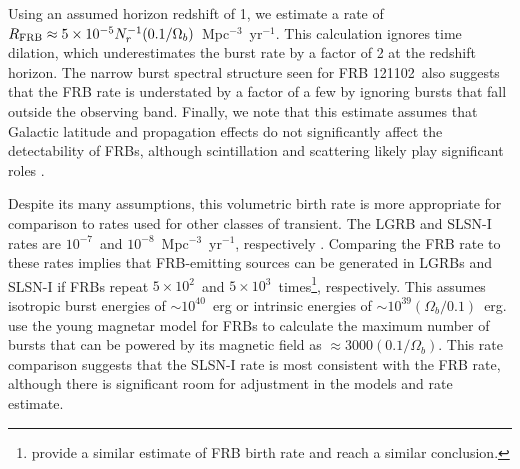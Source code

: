 \documentclass[twocolumn]{aastex61}
\newcommand{\frb}{FRB 121102}
\begin{document}
Using an assumed horizon redshift of 1, we estimate a rate of $R_{\rm{FRB}} \approx 5\times10^{-5} N_r^{-1} (0.1/\Omega_b)$\ Mpc$^{-3}$\ yr$^{-1}$. This calculation ignores time dilation, which underestimates the burst rate by a factor of 2 at the redshift horizon. The narrow burst spectral structure seen for \frb\ also suggests that the FRB rate is understated by a factor of a few by ignoring bursts that fall outside the observing band. Finally, we note that this estimate assumes that Galactic latitude and propagation effects do not significantly affect the detectability of FRBs, although scintillation and scattering likely play significant roles \citep{2015MNRAS.451.3278M, 2017arXiv170306580C}.

Despite its many assumptions, this volumetric birth rate is more appropriate for comparison to rates used for other classes of transient. The LGRB and SLSN-I rates are $10^{-7}$\ and $10^{-8}$\ Mpc$^{-3}$\ yr$^{-1}$, respectively \citep{2007ApJ...657L..73G,2012Sci...337..927G}. Comparing the FRB rate to these rates implies that FRB-emitting sources can be generated in LGRBs and SLSN-I if FRBs repeat $5\times10^2$\ and $5\times10^3$\ times\footnote{\citet{2017arXiv170400022N} provide a similar estimate of FRB birth rate and reach a similar conclusion.}, respectively. This assumes isotropic burst energies of $\sim10^{40}$~erg or intrinsic energies of $\sim10^{39} (\Omega_b/0.1)$~erg. \citet{2017arXiv170102370M} use the young magnetar model for FRBs to calculate the maximum number of bursts that can be powered by its magnetic field as $\approx3000 (0.1/\Omega_b)$. This rate comparison suggests that the SLSN-I rate is most consistent with the FRB rate, although there is significant room for adjustment in the models and rate estimate.

\end{document}
